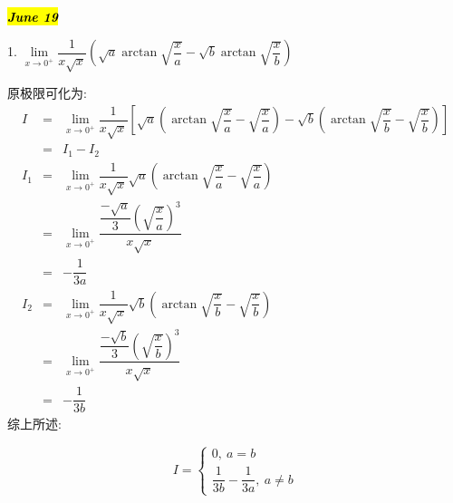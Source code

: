 
\hl{\textbf{\textit{June 19}}}

1. $\lim\limits_{x\rightarrow 0^{+}}\dfrac{1}{x\sqrt{x}}(\sqrt{a}\arctan\sqrt{\dfrac{x}{a}}-\sqrt{b}\arctan\sqrt{\dfrac{x}{b}})$
\begin{solution}
	
	原极限可化为: 
	\begin{eqnarray*}
		I&=&\lim\limits_{x\rightarrow 0^{+}}\dfrac{1}{x\sqrt{x}}[\sqrt{a}(\arctan\sqrt{\dfrac{x}{a}}-\sqrt{\dfrac{x}{a}})-\sqrt{b}(\arctan\sqrt{\dfrac{x}{b}}-\sqrt{\dfrac{x}{b}})]\\
		&=&I_{1}-I_{2}\\
		I_{1}&=&\lim\limits_{x\rightarrow 0^{+}}\dfrac{1}{x\sqrt{x}}\sqrt{a}(\arctan\sqrt{\dfrac{x}{a}}-\sqrt{\dfrac{x}{a}})\\
		&=&\lim\limits_{x\rightarrow 0^{+}}\dfrac{\dfrac{-\sqrt{a}}{3}(\sqrt{\dfrac{x}{a}})^3}{x\sqrt{x}}\\
		&=&-\dfrac{1}{3a}\\
		I_{2}&=&\lim\limits_{x\rightarrow 0^{+}}\dfrac{1}{x\sqrt{x}}\sqrt{b}(\arctan\sqrt{\dfrac{x}{b}}-\sqrt{\dfrac{x}{b}})\\
		&=&\lim\limits_{x\rightarrow 0^{+}}\dfrac{\dfrac{-\sqrt{b}}{3}(\sqrt{\dfrac{x}{b}})^3}{x\sqrt{x}}\\
		&=&-\dfrac{1}{3b}
	\end{eqnarray*}
	综上所述: 
	
	$$I=\left\lbrace 
	\begin{array}{l}
		0,\ a=b\\
		\dfrac{1}{3b}-\dfrac{1}{3a},\ a\neq b
	\end{array}
	\right. $$
\end{solution}


